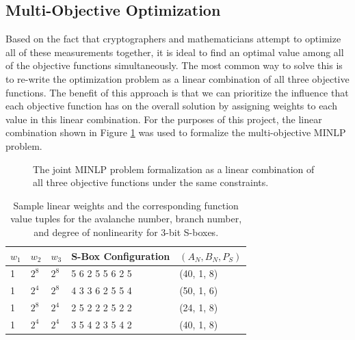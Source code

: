 \documentclass[11pt]{article}
\begin{document}
\subsection{Multi-Objective Optimization}
Based on the fact that cryptographers and mathematicians attempt to optimize all of these measurements together, it is ideal to find an optimal value among all of the objective functions simultaneously. The most common way to solve this is to re-write the optimization problem as a linear combination of all three objective functions. The benefit of this approach is that we can prioritize the influence that each objective function has on the overall solution by assigning weights to each value in this linear combination. For the purposes of this project, the linear combination shown in Figure \ref{jointProblem} was used to formalize the multi-objective MINLP problem.

\begin{figure}
\centering
{}
\label{jointProblem}
\caption{The joint MINLP problem formalization as a linear combination of all three objective functions under the same constraints.}
\end{figure}

\begin{table}
	\centering
	\caption{Sample linear weights and the corresponding function value tuples for the avalanche number, branch number, and degree of nonlinearity for $3$-bit S-boxes.}
	\label{jointTable}
    \begin{tabular}{|l|l|l|l|l|}
        \hline
        $w_1$ & $w_2$ & $w_3$ & S-Box Configuration & $(A_N, B_N, P_S)$ \\ \hline
        1 & $2^8$ & $2^8$ & 5     6     2     5     5     6     2     5 & (40, 1, 8) \\ 
        1 & $2^4$ & $2^8$ & 4     3     3     6     2     5     5     4 & (50, 1, 6) \\ 
        1 & $2^8$ & $2^4$ & 2     5     2     2     2     5     2     2 & (24, 1, 8) \\ 
        1 & $2^4$ & $2^4$ & 3     5     4     2     3     5     4     2 & (40, 1, 8) \\ 
        \hline
    \end{tabular}
\end{table}
\end{document}
